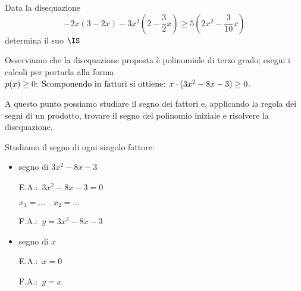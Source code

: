 \begin{esempio}
Data la disequazione
\[-2x(3-2x)-3x^2\left(2-\dfrac{3}{2}x\right) \ge
  5\left(2x^2-\dfrac{3}{10}x\right)\]
determina il suo \(\IS\)

Osserviamo che la disequazione proposta è polinomiale di terzo grado;
esegui i calcoli per portarla alla forma \(p(x)\ge 0$:
\vspace{3em}

Scomponendo in fattori si ottiene: \(x\cdot (3x^2-8x-3)\ge 0\).

A questo punto possiamo studiare il segno dei fattori e, applicando la regola
dei segni di un prodotto, trovare il segno del polinomio iniziale e risolvere
la disequazione.

Studiamo il segno di ogni singolo fattore:
\begin{itemize}

 \item segno di \(3x^2-8x-3\)\\
 \begin{minipage}{.35\textwidth}
  E.A.:~\(3x^2-8x-3=0\)

  \(x_1=\dots \quad x_2=\dots\)
 \end{minipage}
 \begin{minipage}{.25\textwidth}
  F.A.:~\(y=3x^2-8x-3\)
 \end{minipage}
 \begin{minipage}{.38\textwidth}
  \begin{inaccessibleblock}
  \parabolaamadma{}{}
\end{inaccessibleblock}
 \end{minipage}

 \item  segno di \(x\)\\
 \begin{minipage}{.35\textwidth}
  E.A.:~\(x=0\)
  \vspace{1.8em}
 \end{minipage}
 \begin{minipage}{.25\textwidth}
  F.A.:~\(y=x\)
  \vspace{1.8em}
 \end{minipage}
 \begin{minipage}{.38\textwidth}
  \begin{inaccessibleblock}
\end{inaccessibleblock}
 \end{minipage}


\end{itemize}
\end{esempio}
